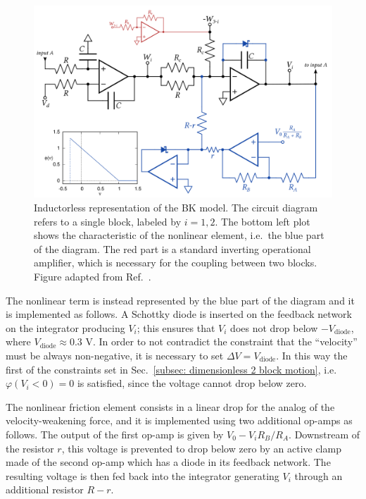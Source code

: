 \begin{figure}[!htbp]
    \centering
    \includegraphics[width=\linewidth]
    {../blocks/1_block/breadboard/breadboard_implementation.png}
    \caption{Inductorless representation of the BK model. The circuit diagram refers to a single block, labeled by $i=1,2$.
    The bottom left plot shows the characteristic of the nonlinear element, i.e.\ the blue part of the diagram.
    The red part is a standard inverting operational amplifier, which is necessary for the coupling between two blocks.
    Figure adapted from Ref.~\cite{ref:electronic_analog}.
    }\label{fig: circuit diagram}
\end{figure}

The nonlinear term is instead represented by the blue part of the diagram and it is implemented as follows.
A Schottky diode is inserted on the feedback network on the integrator producing $V_i$; this ensures that $V_i$ does not
drop below $-V_{\text{diode}}$, where $V_{\text{diode}}\approx 0.3$ V. In order to not contradict the constraint
that the ``velocity'' must be always non-negative, it is necessary to set $\Delta V = V_{\text{diode}}$.
In this way the first of the constraints set in Sec.~\ref{subsec: dimensionless 2 block motion}, i.e.\ $\varphi(V_i < 0 )=0$
is satisfied, since the voltage cannot drop below zero.

The nonlinear friction element consists in a linear drop for the analog of the velocity-weakening force, and it is
implemented using two additional op-amps as follows. The output of the first op-amp is given by $V_0-V_i R_B/R_A$.
Downstream of the resistor $r$, this voltage is prevented to drop below zero by an active
clamp made of the second op-amp which has a diode in its feedback network. The resulting voltage is then fed back into
the integrator generating $V_i$ through an additional resistor $R-r$.


